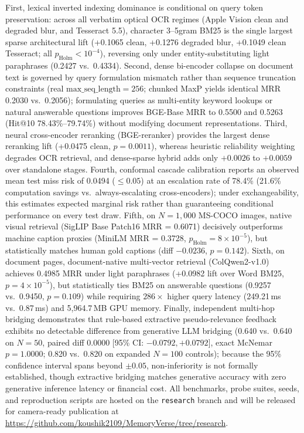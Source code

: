 \documentclass[conference]{IEEEtran}
\begin{document}
First, lexical inverted indexing dominance is conditional on query token preservation: across all verbatim optical OCR regimes (Apple Vision clean and degraded blur, and Tesseract 5.5), character 3--5gram BM25 is the single largest sparse architectural lift (+0.1065 clean, +0.1276 degraded blur, +0.1049 clean Tesseract; all $p_{\text{Holm}} < 10^{-4}$), reversing only under entity-substituting light paraphrases (0.2427 vs.\ 0.4334). Second, dense bi-encoder collapse on document text is governed by query formulation mismatch rather than sequence truncation constraints (real $\text{max\_seq\_length}=256$; chunked MaxP yields identical MRR 0.2030 vs.\ 0.2056); formulating queries as multi-entity keyword lookups or natural answerable questions improves BGE-Base MRR to 0.5500 and 0.5263 (Hit@10 78.43\%--79.74\%) without modifying document representations. Third, neural cross-encoder reranking (BGE-reranker) provides the largest dense reranking lift (+0.0475 clean, $p = 0.0011$), whereas heuristic reliability weighting degrades OCR retrieval, and dense-sparse hybrid adds only $+0.0026$ to $+0.0059$ over standalone stages. Fourth, conformal cascade calibration reports an observed mean test miss risk of 0.0494 ($\le 0.05$) at an escalation rate of 78.4\% (21.6\% computation savings vs.\ always-escalating cross-encoders); under exchangeability, this estimates expected marginal risk rather than guaranteeing conditional performance on every test draw. Fifth, on $N=1{,}000$ MS-COCO images, native visual retrieval (SigLIP Base Patch16 MRR = 0.6071) decisively outperforms machine caption proxies (MiniLM MRR = 0.3728, $p_{\text{Holm}} = 8 \times 10^{-5}$), but statistically matches human gold captions (diff $-0.0236$, $p=0.142$). Sixth, on document pages, document-native multi-vector retrieval (ColQwen2-v1.0) achieves 0.4985 MRR under light paraphrases (+0.0982 lift over Word BM25, $p = 4 \times 10^{-5}$), but statistically ties BM25 on answerable questions (0.9257 vs.\ 0.9450, $p = 0.109$) while requiring $286\times$ higher query latency (249.21\,ms vs.\ 0.87\,ms) and 5,964.7\,MB GPU memory. Finally, independent multi-hop bridging demonstrates that rule-based extractive pseudo-relevance feedback exhibits no detectable difference from generative LLM bridging (0.640 vs.\ 0.640 on $N=50$, paired diff $0.0000$ [95\% CI: $-0.0792, +0.0792$], exact McNemar $p = 1.0000$; 0.820 vs.\ 0.820 on expanded $N=100$ controls); because the 95\% confidence interval spans beyond $\pm 0.05$, non-inferiority is not formally established, though extractive bridging matches generative accuracy with zero generative inference latency or financial cost. All benchmarks, probe suites, seeds, and reproduction scripts are hosted on the \texttt{research} branch and will be released for camera-ready publication at \url{https://github.com/koushik2109/MemoryVerse/tree/research}.
\end{document}
